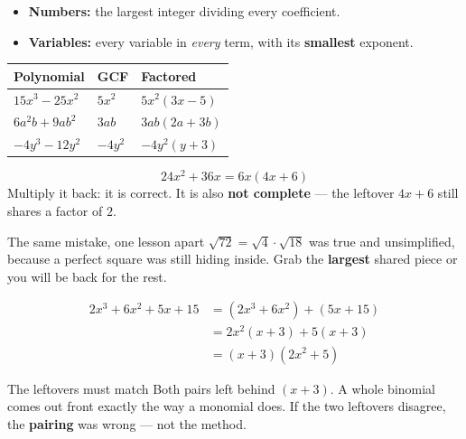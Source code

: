 \documentclass[aspectratio=169, 11pt]{beamer}
\begin{document}
\begin{frame}[t, plain]
  \begin{itemize}
    \setlength{\itemsep}{0.25cm}
    \item \textbf{Numbers:} the largest integer dividing every coefficient.
    \item \textbf{Variables:} every variable in \emph{every} term, with its \textbf{smallest}
          exponent.
  \end{itemize}
  \vspace{0.25cm}
  \renewcommand{\arraystretch}{1.5}
  \begin{tabularx}{\textwidth}{@{}p{3.6cm} p{2.4cm} X@{}}
    \textbf{Polynomial} & \textbf{GCF} & \textbf{Factored} \\
    \hline
    $15x^3-25x^2$    & $5x^2$  & $5x^2(3x-5)$ \\
    $6a^2b+9ab^2$    & $3ab$   & $3ab(2a+3b)$ \\
    $-4y^3-12y^2$    & $-4y^2$ & $-4y^2(y+3)$ \\
  \end{tabularx}
\end{frame}

\begin{frame}[t, plain]
  \[ 24x^2+36x = 6x(4x+6) \]
  Multiply it back: it is correct. It is also \textbf{not complete} --- the leftover $4x+6$ still
  shares a factor of $2$.
  \begin{block}{The same mistake, one lesson apart}
    $\sqrt{72}=\sqrt4\cdot\sqrt{18}$ was true and unsimplified, because a perfect square was still
    hiding inside. Grab the \textbf{largest} shared piece or you will be back for the rest.
  \end{block}
\end{frame}

\begin{frame}[t, plain]
  \[
  \begin{aligned}
    2x^3+6x^2+5x+15 &= \left(2x^3+6x^2\right) + (5x+15) \\
                    &= 2x^2(x+3) + 5(x+3) \\
                    &= (x+3)\left(2x^2+5\right)
  \end{aligned}
  \]
  \begin{block}{The leftovers must match}
    Both pairs left behind $(x+3)$. A whole binomial comes out front exactly the way a monomial
    does. If the two leftovers disagree, the \textbf{pairing} was wrong --- not the method.
  \end{block}
\end{frame}
\end{document}
